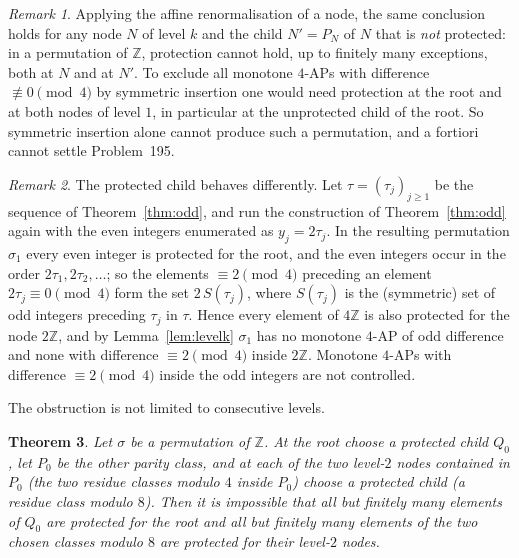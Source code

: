 \documentclass[11pt]{amsart}
\newtheorem{theorem}{Theorem}[section]
\theoremstyle{definition}
\theoremstyle{remark}
\newtheorem{remark}[theorem]{Remark}
\newcommand{\Z}{\mathbb{Z}}
\begin{document}
\begin{remark}
Applying the affine renormalisation of a node, the same conclusion holds for any node $N$ of level $k$ and the child $N'=P_N$ of $N$ that is \emph{not} protected: in a permutation of $\Z$, protection cannot hold, up to finitely many exceptions, both at $N$ and at $N'$. To exclude all monotone $4$-APs with difference $\not\equiv0\pmod 4$ by symmetric insertion one would need protection at the root and at both nodes of level $1$, in particular at the unprotected child of the root. So symmetric insertion alone cannot produce such a permutation, and a fortiori cannot settle Problem~195.
\end{remark}

\begin{remark}\label{rem:inside}
The protected child behaves differently. Let $\tau=(\tau_j)_{j\ge1}$ be the sequence of Theorem~\ref{thm:odd}, and run the construction of Theorem~\ref{thm:odd} again with the even integers enumerated as $y_j=2\tau_j$. In the resulting permutation $\sigma_1$ every even integer is protected for the root, and the even integers occur in the order $2\tau_1,2\tau_2,\dots$; so the elements $\equiv2\pmod 4$ preceding an element $2\tau_j\equiv0\pmod4$ form the set $2\,S(\tau_j)$, where $S(\tau_j)$ is the (symmetric) set of odd integers preceding $\tau_j$ in $\tau$. Hence every element of $4\Z$ is also protected for the node $2\Z$, and by Lemma~\ref{lem:levelk} $\sigma_1$ has no monotone $4$-AP of odd difference and none with difference $\equiv2\pmod4$ inside $2\Z$. Monotone $4$-APs with difference $\equiv2\pmod4$ inside the odd integers are not controlled.
\end{remark}

The obstruction is not limited to consecutive levels.

\begin{theorem}\label{thm:level02}
Let $\sigma$ be a permutation of $\Z$. At the root choose a protected child $Q_0$, let $P_0$ be the other parity class, and at each of the two level-$2$ nodes contained in $P_0$ (the two residue classes modulo $4$ inside $P_0$) choose a protected child (a residue class modulo $8$). Then it is impossible that all but finitely many elements of $Q_0$ are protected for the root and all but finitely many elements of the two chosen classes modulo $8$ are protected for their level-$2$ nodes.
\end{theorem}
\end{document}
